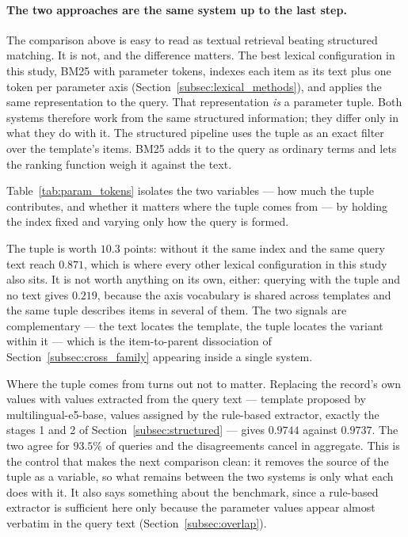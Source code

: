 \documentclass[preprint,12pt]{elsarticle}
\begin{document}
\paragraph{The two approaches are the same system up to the last step.}
The comparison above is easy to read as textual retrieval beating structured matching. It is not, and the difference matters. The best lexical configuration in this study, BM25 with parameter tokens, indexes each item as its text plus one token per parameter axis (Section~\ref{subsec:lexical_methods}), and applies the same representation to the query. That representation \emph{is} a parameter tuple. Both systems therefore work from the same structured information; they differ only in what they do with it. The structured pipeline uses the tuple as an exact filter over the template's items. BM25 adds it to the query as ordinary terms and lets the ranking function weigh it against the text.

Table~\ref{tab:param_tokens} isolates the two variables --- how much the tuple contributes, and whether it matters where the tuple comes from --- by holding the index fixed and varying only how the query is formed.



The tuple is worth $10.3$ points: without it the same index and the same query text reach $0.871$, which is where every other lexical configuration in this study also sits. It is not worth anything on its own, either: querying with the tuple and no text gives $0.219$, because the axis vocabulary is shared across templates and the same tuple describes items in several of them. The two signals are complementary --- the text locates the template, the tuple locates the variant within it --- which is the item-to-parent dissociation of Section~\ref{subsec:cross_family} appearing inside a single system.

Where the tuple comes from turns out not to matter. Replacing the record's own values with values extracted from the query text --- template proposed by multilingual-e5-base, values assigned by the rule-based extractor, exactly the stages 1 and 2 of Section~\ref{subsec:structured} --- gives $0.9744$ against $0.9737$. The two agree for $93.5\%$ of queries and the disagreements cancel in aggregate. This is the control that makes the next comparison clean: it removes the source of the tuple as a variable, so what remains between the two systems is only what each does with it. It also says something about the benchmark, since a rule-based extractor is sufficient here only because the parameter values appear almost verbatim in the query text (Section~\ref{subsec:overlap}).
\end{document}
